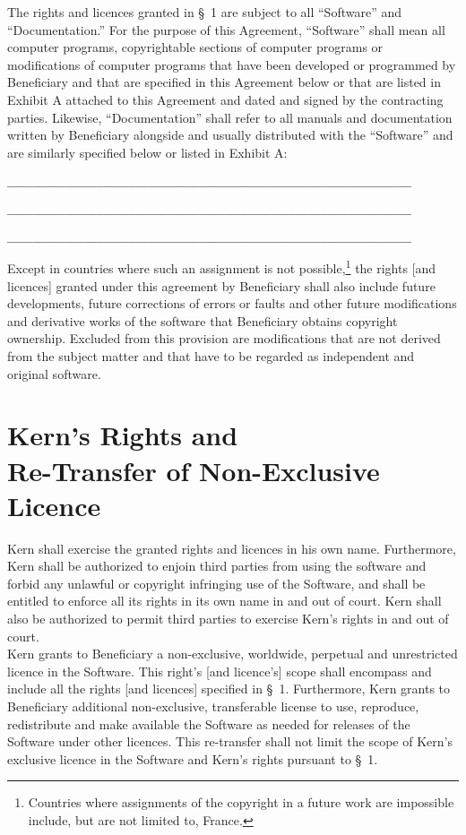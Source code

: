 The rights and licences granted in {\S}~1 are subject to all
``Software'' and ``Documentation.'' For the purpose of this Agreement,
``Software'' shall mean all computer programs, copyrightable sections
of computer programs or modifications of computer programs that have
been developed or programmed by Beneficiary and that are specified in
this Agreement below or that are listed in Exhibit A attached to this
Agreement and dated and signed by the contracting parties. Likewise,
``Documentation'' shall refer to all manuals and documentation written
by Beneficiary alongside and usually distributed with the ``Software''
and are similarly specified below or listed in Exhibit A:
\begin{alltt}
_______________________________________________________________

_______________________________________________________________

_______________________________________________________________
\end{alltt}
Except in countries where such an assignment is not
possible,\footnote{Countries where assignments of the copyright in a
future work are impossible include, but are not limited to, France.}
the rights [and licences] granted under this agreement by Beneficiary
shall also include future developments, future corrections of errors
or faults and other future modifications and derivative works of the
software that Beneficiary obtains copyright ownership.  Excluded from
this provision are modifications that are not derived from the subject
matter and that have to be regarded as independent and original
software. 

\section{Kern's Rights and \\Re-Transfer of Non-Exclusive Licence}
\A Kern shall exercise the granted rights and licences in his
own name. Furthermore, Kern shall be authorized to enjoin third
parties from using the software and forbid any unlawful or copyright
infringing use of the Software, and shall be entitled to enforce all
its rights in its own name in and out of court. Kern shall also
be authorized to permit third parties to exercise Kern's rights
in and out of court.\\ 

\A Kern grants to Beneficiary a non-exclusive, worldwide, perpetual
and unrestricted licence in the Software. This right's [and licence's]
scope shall encompass and include all the rights [and licences]
specified in {\S}~1. Furthermore, Kern grants to Beneficiary
additional non-exclusive, transferable license to use, reproduce,
redistribute and make available the Software as needed for releases of
the Software under other licences.  This re-transfer shall not limit
the scope of Kern's exclusive licence in the Software and Kern's
rights pursuant to {\S}~1.\\


